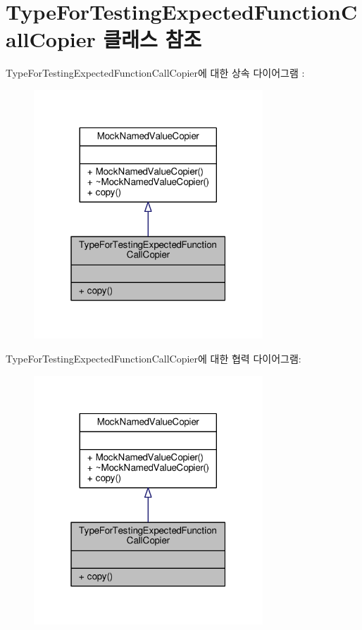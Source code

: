 \hypertarget{class_type_for_testing_expected_function_call_copier}{}\section{Type\+For\+Testing\+Expected\+Function\+Call\+Copier 클래스 참조}
\label{class_type_for_testing_expected_function_call_copier}


Type\+For\+Testing\+Expected\+Function\+Call\+Copier에 대한 상속 다이어그램 \+: 
\nopagebreak
\begin{figure}[H]
\begin{center}
\leavevmode
\includegraphics[width=244pt]{class_type_for_testing_expected_function_call_copier__inherit__graph}
\end{center}
\end{figure}


Type\+For\+Testing\+Expected\+Function\+Call\+Copier에 대한 협력 다이어그램\+:
\nopagebreak
\begin{figure}[H]
\begin{center}
\leavevmode
\includegraphics[width=244pt]{class_type_for_testing_expected_function_call_copier__coll__graph}
\end{center}
\end{figure}
